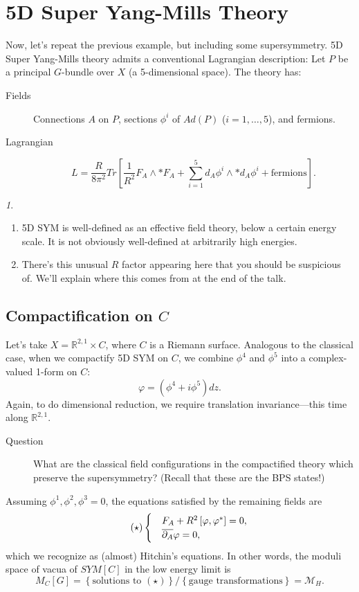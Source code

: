 \documentclass[oneside,english]{amsbook}
\numberwithin{section}{chapter}
\numberwithin{equation}{section}
\numberwithin{figure}{section}
\theoremstyle{plain}
\theoremstyle{definition}
\theoremstyle{remark}
\newtheorem*{rem*}{\protect\remarkname}
\theoremstyle{definition}
\theoremstyle{definition}
\theoremstyle{plain}
\providecommand{\remarkname}{Remark}
\begin{document}
\section{5D Super Yang-Mills Theory}

Now, let's repeat the previous example, but including some supersymmetry.
5D Super Yang-Mills theory admits a conventional Lagrangian description:
Let $P$ be a principal $G$-bundle over $X$ (a 5-dimensional space).
The theory has: 
\begin{description}
\item [{Fields}] Connections $A$ on $P$, sections $\phi^{i}$ of $Ad\left(P\right)$
($i=1,\ldots,5$), and fermions.
\item [{Lagrangian}] 
\[
L=\frac{R}{8\pi^{2}}Tr\left[\frac{1}{R^{2}}F_{A}\wedge*F_{A}+\sum_{i=1}^{5}d_{A}\phi^{i}\wedge*d_{A}\phi^{i}+\mbox{fermions}\right].
\]
\end{description}
\begin{rem*}
~
\begin{enumerate}
\item 5D SYM is well-defined as an effective field theory, below a certain
energy scale. It is not obviously well-defined at arbitrarily high
energies. 
\item There's this unusual $R$ factor appearing here that you should be
suspicious of. We'll explain where this comes from at the end of the
talk.
\end{enumerate}
\end{rem*}

\subsection*{Compactification on $C$}

Let's take $X=\mathbb{R}^{2,1}\times C$, where $C$ is a Riemann
surface. Analogous to the classical case, when we compactify 5D SYM
on $C$, we combine $\phi^{4}$ and $\phi^{5}$ into a complex-valued
1-form on $C$: 
\[
\varphi=\left(\phi^{4}+i\phi^{5}\right)dz.
\]
Again, to do dimensional reduction, we require translation invariance---this
time along $\mathbb{R}^{2,1}$. 
\begin{description}
\item [{Question}] What are the classical field configurations in the compactified
theory which preserve the supersymmetry? (Recall that these are the
BPS states!)
\end{description}
Assuming $\phi^{1},\phi^{2},\phi^{3}=0$, the equations satisfied
by the remaining fields are 
\[
\tag{\ensuremath{\star}}\begin{cases}
 & F_{A}+R^{2}\left[\varphi,\varphi^{*}\right]=0,\\
 & \overline{\partial_{A}}\varphi=0,
\end{cases}
\]
which we recognize as (almost) Hitchin's equations. In other words,
the moduli space of vacua of $SYM[C]$ in the low energy limit is
\[
M_{C}\left[G\right]=\left\{ \mbox{solutions to }(\star)\right\} /\left\{ \mbox{gauge transformations}\right\} =\mathcal{M}_{H}.
\]
\end{document}
